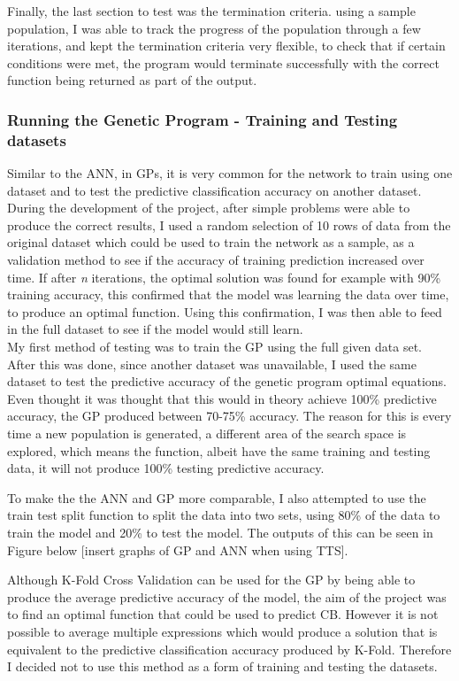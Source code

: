 \documentclass[11pt]{article}
\begin{document}
Finally, the last section to test was the termination criteria. using a sample population, I was able to track the progress of the population through a few iterations, and kept the termination criteria very flexible, to check that if certain conditions were met, the program would terminate successfully with the correct function being returned as part of the output. 


\subsubsection{Running the Genetic Program - Training and Testing datasets}
Similar to the ANN, in GPs, it is very common for the network to train using one dataset and to test the predictive classification accuracy on another dataset. During the development of the project, after simple problems were able to produce the correct results, I used a random selection of 10 rows of data from the original dataset which could be used to train the network as a sample, as a validation method to see if the accuracy of training prediction increased over time. If after \textit{n} iterations, the optimal solution was found for example with 90\% training accuracy, this confirmed that the model was learning the data over time, to produce an optimal function. Using this confirmation, I was then able to feed in the full dataset to see if the model would still learn. \\
My first method of testing was to train the GP using the full given data set. After this was done, since another dataset was unavailable, I used the same dataset to test the predictive accuracy of the genetic program optimal equations. Even thought it was thought that this would in theory achieve 100\% predictive accuracy, the GP produced between 70-75\% accuracy. The reason for this is every time a new population is generated, a different area of the search space is explored, which means the function, albeit have the same training and testing data, it will not produce 100\% testing predictive accuracy. 

To make the the ANN and GP more comparable, I also attempted to use the train test split function to split the data into two sets, using 80\% of the data to train the model and 20\% to test the model. The outputs of this can be seen in Figure below [insert graphs of GP and ANN when using TTS]. 

Although K-Fold Cross Validation can be used for the GP by being able to produce the average predictive accuracy of the model, the aim of the project was to find an optimal function that could be used to predict CB. However it is not possible to average multiple expressions which would produce a solution that is equivalent to the predictive classification accuracy produced by K-Fold. Therefore I decided not to use this method as a form of training and testing the datasets. 
\end{document}
